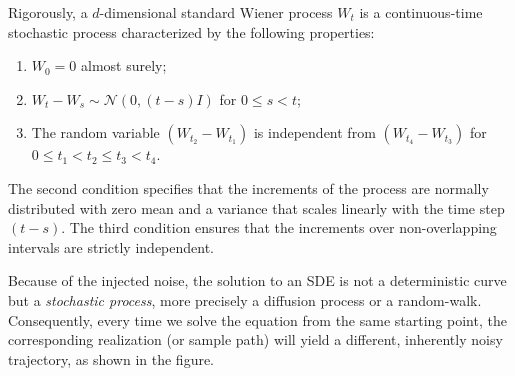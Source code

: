 Rigorously, a $d$-dimensional standard Wiener process $W_t$ is a continuous-time stochastic process characterized by the following properties:
\begin{enumerate}
    \item $W_0 = 0$ almost surely;
    \item $W_t - W_s \sim \mathcal{N}(0, (t-s)I)$ for $0 \leq s < t$;
    \item The random variable $(W_{t_2} - W_{t_1})$ is independent from $(W_{t_4} - W_{t_3})$ for $0 \leq t_1 < t_2 \leq t_3 < t_4$.
\end{enumerate}
The second condition specifies that the increments of the process are normally distributed with zero mean and a variance that scales linearly with the time step $(t-s)$. The third condition ensures that the increments over non-overlapping intervals are strictly independent.

Because of the injected noise, the solution to an SDE is not a deterministic curve but a \textit{stochastic process}, more precisely a diffusion process or a random-walk. Consequently, every time we solve the equation from the same starting point, the corresponding realization (or sample path) will yield a different, inherently noisy trajectory, as shown in the figure.

